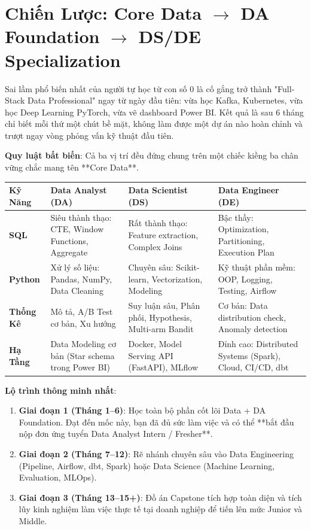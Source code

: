 \section{Chiến Lược: Core Data $\rightarrow$ DA Foundation $\rightarrow$ DS/DE Specialization}

Sai lầm phổ biến nhất của người tự học từ con số 0 là cố gắng trở thành "Full-Stack Data Professional" ngay từ ngày đầu tiên: vừa học Kafka, Kubernetes, vừa học Deep Learning PyTorch, vừa vẽ dashboard Power BI. Kết quả là sau 6 tháng chỉ biết mỗi thứ một chút bề mặt, không làm được một dự án nào hoàn chỉnh và trượt ngay vòng phỏng vấn kỹ thuật đầu tiên.

\textbf{Quy luật bất biến}: Cả ba vị trí đều đứng chung trên một chiếc kiềng ba chân vững chắc mang tên **Core Data**.

\begin{center}
\begin{tabular}{|l|p{4cm}|p{4.5cm}|p{4.5cm}|}
\hline
\textbf{Kỹ Năng} & \textbf{Data Analyst (DA)} & \textbf{Data Scientist (DS)} & \textbf{Data Engineer (DE)} \\
\hline
\textbf{SQL} & Siêu thành thạo: CTE, Window Functions, Aggregate & Rất thành thạo: Feature extraction, Complex Joins & Bậc thầy: Optimization, Partitioning, Execution Plan \\
\hline
\textbf{Python} & Xử lý số liệu: Pandas, NumPy, Data Cleaning & Chuyên sâu: Scikit-learn, Vectorization, Modeling & Kỹ thuật phần mềm: OOP, Logging, Testing, Airflow \\
\hline
\textbf{Thống Kê} & Mô tả, A/B Test cơ bản, Xu hướng & Suy luận sâu, Phân phối, Hypothesis, Multi-arm Bandit & Cơ bản: Data distribution check, Anomaly detection \\
\hline
\textbf{Hạ Tầng} & Data Modeling cơ bản (Star schema trong Power BI) & Docker, Model Serving API (FastAPI), MLflow & Đỉnh cao: Distributed Systems (Spark), Cloud, CI/CD, dbt \\
\hline
\end{tabular}
\end{center}

\textbf{Lộ trình thông minh nhất}:
\begin{enumerate}
    \item \textbf{Giai đoạn 1 (Tháng 1--6)}: Học toàn bộ phần cốt lõi Data + DA Foundation. Đạt đến mốc này, bạn đã đủ sức làm việc và có thể **bắt đầu nộp đơn ứng tuyển Data Analyst Intern / Fresher**.
    \item \textbf{Giai đoạn 2 (Tháng 7--12)}: Rẽ nhánh chuyên sâu vào Data Engineering (Pipeline, Airflow, dbt, Spark) hoặc Data Science (Machine Learning, Evaluation, MLOps).
    \item \textbf{Giai đoạn 3 (Tháng 13--15+)}: Đồ án Capstone tích hợp toàn diện và tích lũy kinh nghiệm làm việc thực tế tại doanh nghiệp để tiến lên mức Junior và Middle.
\end{enumerate}

